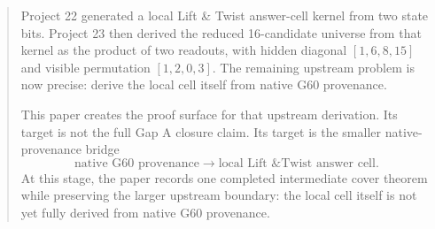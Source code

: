 \begin{abstract}
Project 22 generated a local Lift \& Twist answer-cell kernel from two state bits.  Project 23 then derived the reduced 16-candidate universe from that kernel as the product of two readouts, with hidden diagonal \([1,6,8,15]\) and visible permutation \([1,2,0,3]\).  The remaining upstream problem is now precise: derive the local cell itself from native G60 provenance.

This paper creates the proof surface for that upstream derivation.  Its target is not the full Gap A closure claim.  Its target is the smaller native-provenance bridge
\[
    \text{native G60 provenance}
    \longrightarrow
    \text{local Lift \& Twist answer cell}.
\]
At this stage, the paper records one completed intermediate cover theorem while preserving the larger upstream boundary: the local cell itself is not yet fully derived from native G60 provenance.
\end{abstract}
